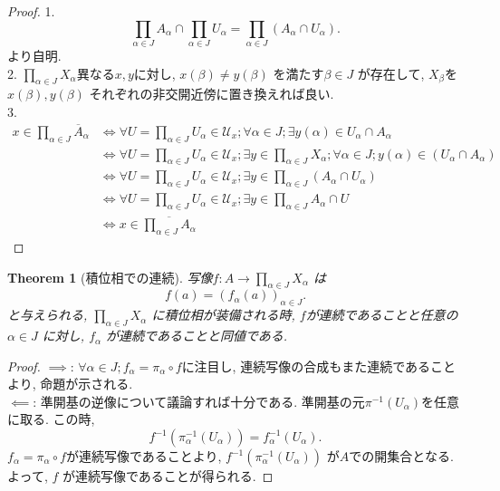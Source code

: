 \documentclass[lualatex]{ltjsbook}
\newcommand{\cl}[1]{\overline{ #1}  }
\newtheorem{theorem}{Theorem}[chapter]
\theoremstyle{remark}
\theoremstyle{plain}
\begin{document}
\begin{proof}
	1.\[
\prod_{\alpha \in J} A_{\alpha}  \cap \prod_{\alpha \in J} U_{\alpha}  = \prod_{\alpha \in J}\left( A_{\alpha}  \cap U_{\alpha}	\right)
	.\] より自明.\\
	2. $\prod_{\alpha \in J} X_{\alpha}  $異なる$x, y$に対し,  $x(\beta) \neq y(\beta)$ を満たす$\beta \in J$ が存在して,  
	$X_{\beta}$を $x\left( \beta \right) ,  y\left( \beta \right) $ それぞれの非交開近傍に置き換えれば良い.\\
	3. 
	$$
	\begin{aligned}
		x \in \prod_{\alpha \in J} \cl{A}_{\alpha} & \iff \forall U = \prod_{\alpha \in J} U_{\alpha}   \in \mathcal{U}_x; \forall \alpha \in J ; \exists y(\alpha) \in U_{\alpha} \cap A_{\alpha}\\
   &\iff \forall U = \prod_{\alpha \in J} U_{\alpha} \in \mathcal{U}_x; \exists y \in \prod_{\alpha \in J} X_{\alpha}  ; \forall \alpha \in J; y(\alpha) \in \left( U_{\alpha} \cap  A_{\alpha} \right) \\
   &\iff \forall  U = \prod_{\alpha \in J} U_{\alpha} \in \mathcal{U}_x; \exists y \in \prod_{\alpha \in J} (A_{\alpha} \cap U_{\alpha}) \\
   &\iff \forall U = \prod_{\alpha \in J} U_{\alpha} \in \mathcal{U}_x; \exists y \in \prod_{\alpha \in J} A_{\alpha} \cap U \\
   &   \iff x \in \cl{\prod_{\alpha \in J} A_{\alpha}  }
	\end{aligned}
	$$

\end{proof}

\begin{theorem}[積位相での連続]
	写像$f: A\to  \prod_{\alpha \in J} X_{\alpha}  $ は
	\[
	f(a) = (f_{\alpha}(a))_{\alpha \in J}
	.\] 
	と与えられる,  $\prod_{\alpha \in J} X_{\alpha}  $ に積位相が装備される時,  $f$が連続であることと任意の $\alpha \in J$ に対し,  $f_{\alpha}$ が連続であることと同値である.
\end{theorem}

\begin{proof}
	$\implies$: $\forall \alpha \in J; f_{\alpha} = \pi_{\alpha} \circ f$に注目し,  連続写像の合成もまた連続であることより,  命題が示される.\\
	 $\impliedby$: 準開基の逆像について議論すれば十分である. 準開基の元$\pi^{-1}\left( U_{\alpha}\right) $を任意に取る. この時,  
	  \[
	 f^{-1}\left(\pi_{\alpha} ^{-1} \left( U_{\alpha}  \right) \right) = f_{\alpha}^{-1}\left( U_{\alpha} \right) 
	 .\] 
	 $f_{\alpha} = \pi_{\alpha} \circ f$が連続写像であることより,  
	 $f^{-1} \left( \pi_{\alpha} ^{-1}\left( U_{\alpha} \right)  \right) $ が$A$での開集合となる. 
	 よって,   $f$ が連続写像であることが得られる. 
\end{proof}
\end{document}

